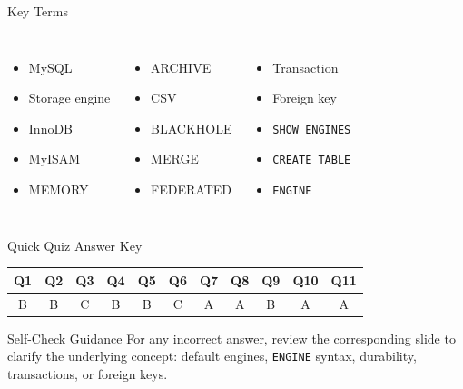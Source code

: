 \documentclass[aspectratio=169,11pt]{beamer}
\newcommand{\code}[1]{\texttt{#1}}
\newcommand{\smallitem}{\setlength{\itemsep}{2pt}}
\begin{document}
\begin{frame}{Key Terms}
\begin{columns}[T,onlytextwidth]
\begin{itemize}\smallitem
  \item MySQL
  \item Storage engine
  \item InnoDB
  \item MyISAM
  \item MEMORY
\end{itemize}
\begin{itemize}\smallitem
  \item ARCHIVE
  \item CSV
  \item BLACKHOLE
  \item MERGE
  \item FEDERATED
\end{itemize}
\begin{itemize}\smallitem
  \item Transaction
  \item Foreign key
  \item \code{SHOW ENGINES}
  \item \code{CREATE TABLE}
  \item \code{ENGINE}
\end{itemize}
\end{columns}
\end{frame}

\begin{frame}{Quick Quiz Answer Key}
\begin{center}
\begin{tabular}{ccccccccccc}
\toprule
\textbf{Q1} & \textbf{Q2} & \textbf{Q3} & \textbf{Q4} & \textbf{Q5} & \textbf{Q6} & \textbf{Q7} & \textbf{Q8} & \textbf{Q9} & \textbf{Q10} & \textbf{Q11} \\
\midrule
B & B & C & B & B & C & A & A & B & A & A \\
\bottomrule
\end{tabular}
\end{center}
\vspace{0.35cm}
\begin{block}{Self-Check Guidance}
For any incorrect answer, review the corresponding slide to clarify the underlying concept: default engines, \code{ENGINE} syntax, durability, transactions, or foreign keys.
\end{block}
\end{frame}
\end{document}
